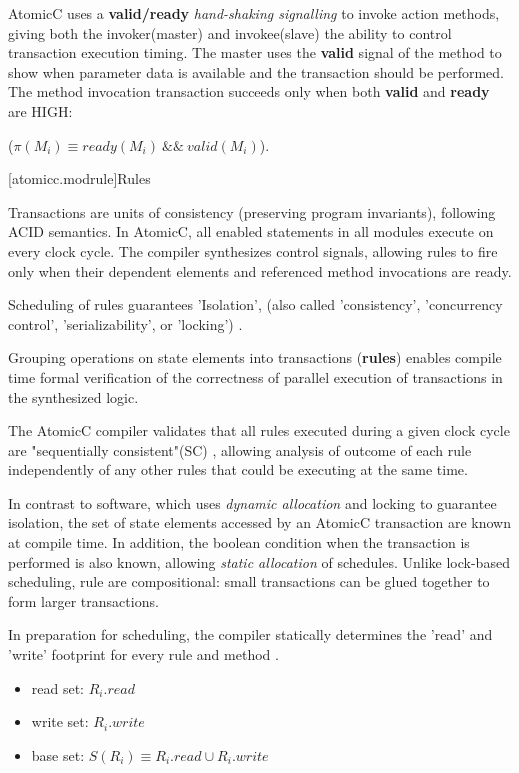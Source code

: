 AtomicC uses a \textbf{valid/ready} \textit{hand-shaking signalling}
\cite{Fletcher2009, AXISpec} to invoke action methods,
giving both the invoker(master) and invokee(slave) the ability to control transaction
execution timing.
The master uses the \textbf{valid} signal
of the method to show when parameter data is available and the transaction should be performed.
The method invocation transaction succeeds only when
both \textbf{valid} and \textbf{ready} are HIGH:

 ($\pi(M_{i}) \equiv ready(M_{i})\ \&\&\ valid(M_{i})$).

[atomicc.modrule]{Rules}

Transactions are units of consistency (preserving program invariants), following ACID semantics.
In AtomicC, all enabled statements in all modules execute on every clock cycle.
The compiler synthesizes control signals, allowing rules to fire
only when their dependent elements and referenced method invocations are ready.

Scheduling of rules guarantees 'Isolation',
(also called 'consistency', 'concurrency control', 'serializability', or 'locking')
\cite[Sec.~7.1]{GrayR93}.

Grouping operations on state elements into transactions (\textbf{rules})
enables compile time formal verification of the correctness of
parallel execution of transactions
in the synthesized logic.
\cite{nurvitadhi2011automatic}
\cite{fox2003algebraic}

The AtomicC compiler
validates that all rules executed during a given clock cycle are
"sequentially consistent"(SC) \cite{Lamport:1979:MMC:1311099.1311750},
allowing analysis of
outcome of each rule independently of any other rules that could be executing at the same time.

In contrast to software, which uses \textit{dynamic allocation}\cite[p.~377]{GrayR93}
and locking\cite[Sec.~11.2]{OV11} to guarantee isolation,
the set of state elements accessed by an AtomicC transaction are known at compile time.
In addition, the boolean condition when the transaction is performed
is also known, allowing \textit{static allocation}\cite[Sec.~7.3.1]{GrayR93} of schedules.
Unlike lock-based scheduling,
rule are compositional: small transactions can be glued together to form larger transactions.

In preparation for scheduling, the compiler statically determines the 'read' and 'write'
footprint for every rule and method \cite[Sec.~10.1.2]{OV11} \cite{RosenkrantzSternsLewis}.
\begin{itemize}
\item read set: $R_{i}.read$
\item write set: $R_{i}.write$
\item base set: $S(R_{i}) \equiv R_{i}.read \cup R_{i}.write$
\end{itemize}


